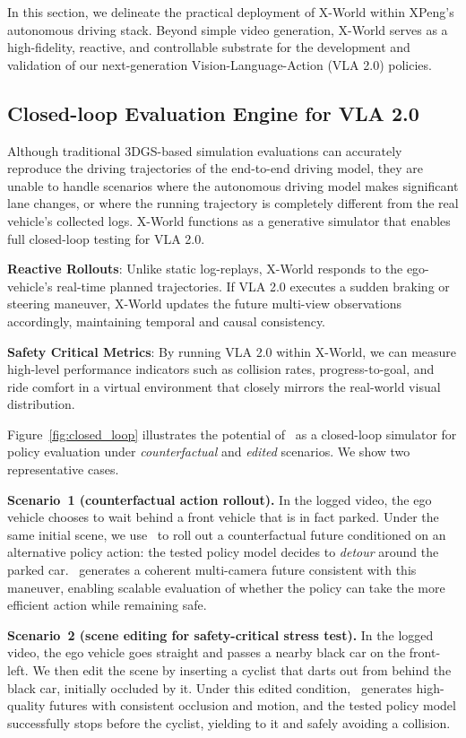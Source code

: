 In this section, we delineate the practical deployment of X-World within XPeng's autonomous driving stack. Beyond simple video generation, X-World serves as a high-fidelity, reactive, and controllable substrate for the development and validation of our next-generation Vision-Language-Action (VLA 2.0) policies.

\subsection{Closed-loop Evaluation Engine for VLA 2.0}
Although traditional 3DGS-based simulation evaluations can accurately reproduce the driving trajectories of the end-to-end driving model, they are unable to handle scenarios where the autonomous driving model makes significant lane changes, or where the running trajectory is completely different from the real vehicle's collected logs. X-World functions as a generative simulator that enables full closed-loop testing for VLA 2.0.

\textbf{Reactive Rollouts}: Unlike static log-replays, X-World responds to the ego-vehicle's real-time planned trajectories. If VLA 2.0 executes a sudden braking or steering maneuver, X-World updates the future multi-view observations accordingly, maintaining temporal and causal consistency. 

\textbf{Safety Critical Metrics}: By running VLA 2.0 within X-World, we can measure high-level performance indicators such as collision rates, progress-to-goal, and ride comfort in a virtual environment that closely mirrors the real-world visual distribution.

Figure~\ref{fig:closed_loop} illustrates the potential of \modelname~as a closed-loop simulator for policy evaluation under \emph{counterfactual} and \emph{edited} scenarios. We show two representative cases.

\textbf{Scenario~1 (counterfactual action rollout).}
In the logged video, the ego vehicle chooses to wait behind a front vehicle that is in fact parked. Under the same initial scene, we use \modelname~to roll out a counterfactual future conditioned on an alternative policy action: the tested policy model decides to \emph{detour} around the parked car. \modelname~generates a coherent multi-camera future consistent with this maneuver, enabling scalable evaluation of whether the policy can take the more efficient action while remaining safe.

\textbf{Scenario~2 (scene editing for safety-critical stress test).}
In the logged video, the ego vehicle goes straight and passes a nearby black car on the front-left. We then edit the scene by inserting a cyclist that darts out from behind the black car, initially occluded by it. Under this edited condition, \modelname~generates high-quality futures with consistent occlusion and motion, and the tested policy model successfully stops before the cyclist, yielding to it and safely avoiding a collision.

